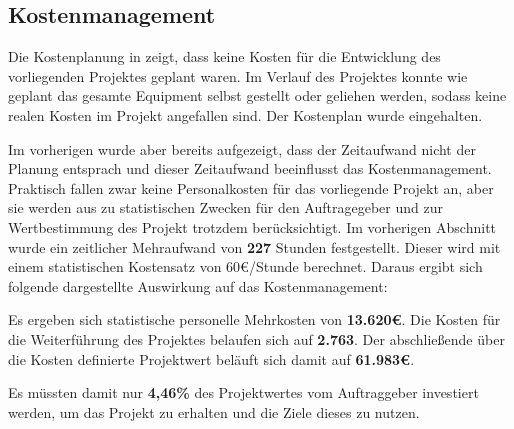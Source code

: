 \subsection{Kostenmanagement}
\label{sec:Kostenmanagement}


Die Kostenplanung in  zeigt, dass keine Kosten für die Entwicklung des vorliegenden Projektes
geplant waren. Im Verlauf des Projektes konnte wie geplant das gesamte Equipment selbst gestellt oder geliehen werden,
sodass keine realen Kosten im Projekt angefallen sind. Der Kostenplan wurde eingehalten.

Im vorherigen  wurde aber bereits aufgezeigt, dass der Zeitaufwand nicht der Planung entsprach und
dieser Zeitaufwand beeinflusst das Kostenmanagement. Praktisch fallen zwar keine Personalkosten für das vorliegende Projekt
an, aber sie werden aus zu statistischen Zwecken für den Auftragegeber und zur
Wertbestimmung des Projekt trotzdem berücksichtigt. Im vorherigen Abschnitt wurde ein zeitlicher Mehraufwand von \textbf{227} Stunden festgestellt. Dieser
wird mit einem statistischen Kostensatz von 60€/Stunde berechnet. Daraus ergibt sich folgende dargestellte
Auswirkung auf das Kostenmanagement:


Es ergeben sich statistische personelle Mehrkosten von \textbf{13.620€}. Die Kosten
für die Weiterführung des Projektes belaufen sich auf \textbf{2.763}. Der abschließende
über die Kosten definierte Projektwert beläuft sich damit auf \textbf{61.983€}.

Es müssten damit nur \textbf{4,46\%} des Projektwertes vom Auftraggeber investiert werden,
um das Projekt zu erhalten und die Ziele dieses zu nutzen.